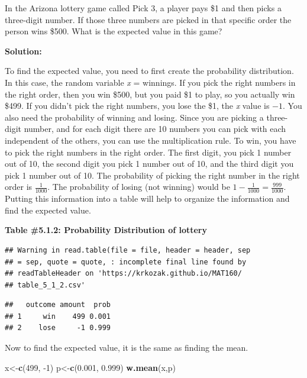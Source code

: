 \documentclass[
]{book}
\newenvironment{Shaded}{\begin{snugshade}}{\end{snugshade}}
\newcommand{\DecValTok}[1]{\textcolor[rgb]{0.00,0.00,0.81}{#1}}
\newcommand{\FloatTok}[1]{\textcolor[rgb]{0.00,0.00,0.81}{#1}}
\newcommand{\KeywordTok}[1]{\textcolor[rgb]{0.13,0.29,0.53}{\textbf{#1}}}
\newcommand{\NormalTok}[1]{#1}
\begin{document}
In the Arizona lottery game called Pick 3, a player pays \$1 and then picks a three-digit number. If those three numbers are picked in that specific order the person wins \$500. What is the expected value in this game?

\textbf{Solution:}

To find the expected value, you need to first create the probability distribution. In this case, the random variable \emph{x} = winnings. If you pick the right numbers in the right order, then you win \$500, but you paid \$1 to play, so you actually win \$499. If you didn't pick the right numbers, you lose the \$1, the \emph{x} value is \(-1\). You also need the probability of winning and losing. Since you are picking a three-digit number, and for each digit there are 10 numbers you can pick with each independent of the others, you can use the multiplication rule. To win, you have to pick the right numbers in the right order. The first digit, you pick 1 number out of 10, the second digit you pick 1 number out of 10, and the third digit you pick 1 number out of 10. The probability of picking the right number in the right order is \(\frac{1}{1000}\). The probability of losing (not winning) would be \(1-\frac{1}{1000}=\frac{999}{1000}\). Putting this information into a table will help to organize the information and find the expected value.

\textbf{Table \#5.1.2: Probability Distribution of lottery}

\begin{verbatim}
## Warning in read.table(file = file, header = header, sep
## = sep, quote = quote, : incomplete final line found by
## readTableHeader on 'https://krkozak.github.io/MAT160/
## table_5_1_2.csv'
\end{verbatim}

\begin{verbatim}
##   outcome amount  prob
## 1     win    499 0.001
## 2    lose     -1 0.999
\end{verbatim}

Now to find the expected value, it is the same as finding the mean.

\begin{Shaded}
\begin{Highlighting}[]
\NormalTok{x<-}\KeywordTok{c}\NormalTok{(}\DecValTok{499}\NormalTok{, }\DecValTok{-1}\NormalTok{)}
\NormalTok{p<-}\KeywordTok{c}\NormalTok{(}\FloatTok{0.001}\NormalTok{, }\FloatTok{0.999}\NormalTok{)}
\KeywordTok{w.mean}\NormalTok{(x,p)}
\end{Highlighting}
\end{Shaded}
\end{document}
